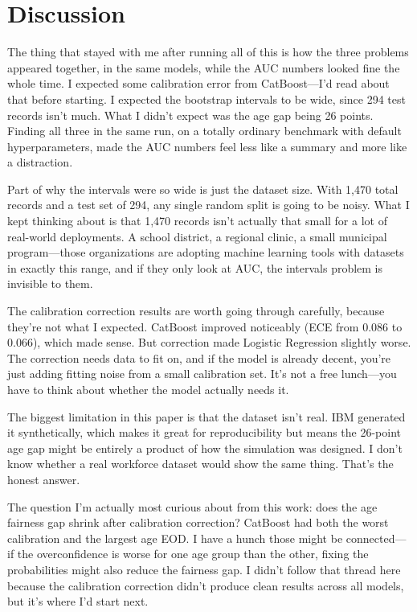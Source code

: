 \documentclass[12pt]{article}
\begin{document}
\section{Discussion}

The thing that stayed with me after running all of this is how the three
problems appeared together, in the same models, while the AUC numbers looked
fine the whole time. I expected some calibration error from CatBoost---I'd
read about that before starting. I expected the bootstrap intervals to be
wide, since 294 test records isn't much. What I didn't expect was the age
gap being 26 points. Finding all three in the same run, on a totally ordinary
benchmark with default hyperparameters, made the AUC numbers feel less like
a summary and more like a distraction.

Part of why the intervals were so wide is just the dataset size. With 1,470
total records and a test set of 294, any single random split is going to be
noisy. What I kept thinking about is that 1,470 records isn't actually that
small for a lot of real-world deployments. A school district, a regional
clinic, a small municipal program---those organizations are adopting
machine learning tools with datasets in exactly this range, and if they
only look at AUC, the intervals problem is invisible to them.

The calibration correction results are worth going through carefully,
because they're not what I expected. CatBoost improved noticeably
(ECE from 0.086 to 0.066), which made sense. But correction made
Logistic Regression slightly worse. The correction needs
data to fit on, and if the model is already decent, you're just adding
fitting noise from a small calibration set. It's not a free lunch---you
have to think about whether the model actually needs it.

The biggest limitation in this paper is that the dataset isn't real. IBM
generated it synthetically, which makes it great for reproducibility but
means the 26-point age gap might be entirely a product of how the simulation
was designed. I don't know whether a real workforce dataset would show the
same thing. That's the honest answer.

The question I'm actually most curious about from this work: does the age
fairness gap shrink after calibration correction? CatBoost had both the
worst calibration and the largest age EOD. I have a hunch those might be
connected---if the overconfidence is worse for one age group than the other,
fixing the probabilities might also reduce the fairness gap. I didn't
follow that thread here because the calibration correction didn't produce
clean results across all models, but it's where I'd start next.
\end{document}
